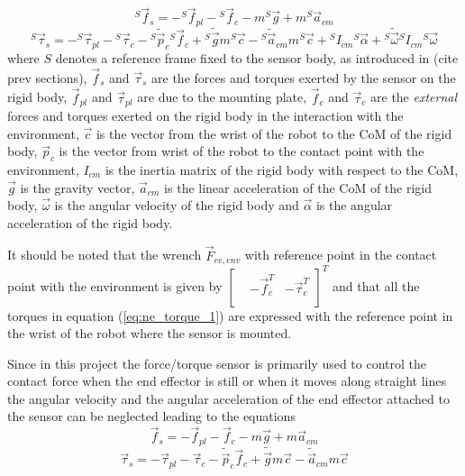 \begin{equation}
  {}^S \vec{f}_{s} = -{}^S \vec{f}_{pl} -{}^S \vec{f}_{c} -m {}^S \vec{g} + m {}^S \vec{a}_{cm}
\end{equation}
\begin{equation}\label{eq:ne_torque_1}
  {}^S \vec{\tau}_{s} = -{}^S \vec{\tau}_{pl} -{}^S \vec{\tau}_{c} -{}^S \tilde{\vec{p}}_{c} {}^S \vec{f}_{c}
  +{}^S \tilde{\vec{g}} m{}^S\vec{c} - {}^S \tilde{\vec{a}}_{cm} m {}^S \vec{c} + {}^S I_{cm} {}^S\vec{\alpha} 
  +{}^S \tilde{\vec{\omega}} {}^S I_{cm} {}^S \vec{\omega}
\end{equation}
where $S$ denotes a reference frame fixed to the sensor body, as introduced in (cite prev sections),
$\vec{f}_{s}$ and $\vec{\tau}_{s}$ are the forces and torques exerted by the sensor on the rigid body,
$\vec{f}_{pl}$ and $\vec{\tau}_{pl}$ are due to the mounting plate,
$\vec{f}_{c}$ and $\vec{\tau}_{c}$ are the \emph{external} forces and torques exerted on the rigid body in the interaction
with the environment,
$\vec{c}$ is the vector from the wrist of the robot to the CoM of the rigid body,
$\vec{p}_{c}$ is the vector from wrist of the robot to the contact point with the environment,
$I_{cm}$ is the inertia matrix of the rigid body with respect to the CoM,
$\vec{g}$ is the gravity vector, $\vec{a}_{cm}$ is the linear acceleration of the CoM of the rigid body,
$\vec{\omega}$ is the angular velocity of the rigid body and
$\vec{\alpha}$ is the angular acceleration of the rigid body.
\par
It should be noted that the wrench $\vec{F}_{ee,env}$ with reference point in the contact point with the environment is given by
$\begin{bmatrix}
  & -\vec{f}_{c} ^T & - \vec{\tau}_{c} ^ T \\
\end{bmatrix}^T$
and that all the torques in equation (\ref{eq:ne_torque_1}) are expressed with the reference point in the wrist
of the robot where the sensor is mounted.
\par
Since in this project the force/torque sensor is primarily used to control the contact force when the end effector
is still or when it moves along straight lines the angular velocity and the angular acceleration of the end effector
attached to the sensor can be neglected leading to the equations
\begin{equation}\label{eq:ne_force_2}
   \vec{f}_{s} = - \vec{f}_{pl} - \vec{f}_{c} -m  \vec{g} + m  \vec{a}_{cm}
\end{equation}
\begin{equation}\label{eq:ne_torque_2}
   \vec{\tau}_{s} = - \vec{\tau}_{pl} - \vec{\tau}_{c} - \tilde{\vec{p}}_{c}  \vec{f}_{c}
  + \tilde{\vec{g}} m\vec{c} -  \tilde{\vec{a}}_{cm} m  \vec{c}
\end{equation}

